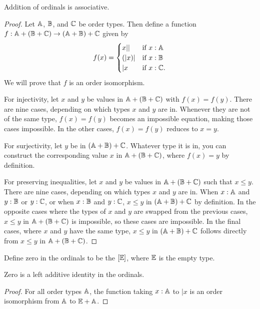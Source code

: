 \documentclass[../../math.tex]{subfiles}
\begin{document}
\begin{instance}
    Addition of ordinals is associative.
\end{instance}
\begin{proof}
    Let $\mathbb{A}$, $\mathbb{B}$, and $\mathbb{C}$ be order types.  Then define a function $f : \mathbb{A} +
    (\mathbb{B} + \mathbb{C}) \to (\mathbb{A} + \mathbb{B}) + \mathbb{C}$ given by
    \[
        f(x) =
        \begin{cases}
            x|| &\text{if $x : \mathbb{A}$} \\
            (|x)| &\text{if $x : \mathbb{B}$} \\
            |x &\text{if $x : \mathbb{C}$.}
        \end{cases}
    \]
    We will prove that $f$ is an order isomorphism.

    For injectivity, let $x$ and $y$ be values in $\mathbb{A} + (\mathbb{B} + \mathbb{C})$ with $f(x) =
    f(y)$.  There are nine cases, depending on which types $x$ and $y$ are in.
    Whenever they are not of the same type, $f(x) = f(y)$ becomes an impossible
    equation, making those cases impossible.  In the other cases, $f(x) = f(y)$
    reduces to $x = y$.

    For surjectivity, let $y$ be in $(\mathbb{A} + \mathbb{B}) + \mathbb{C}$.  Whatever type it is in,
    you can construct the corresponding value $x$ in $\mathbb{A} + (\mathbb{B} + \mathbb{C})$, where
    $f(x) = y$ by definition.

    For preserving inequalities, let $x$ and $y$ be values in $\mathbb{A} + (\mathbb{B} + \mathbb{C})$
    such that $x \leq y$.  There are nine cases, depending on which types $x$
    and $y$ are in.  When $x : \mathbb{A}$ and $y : \mathbb{B}$ or $y : \mathbb{C}$, or when $x : \mathbb{B}$
    and $y : \mathbb{C}$, $x \leq y$ in $(\mathbb{A} + \mathbb{B}) + \mathbb{C}$ by definition.  In the opposite
    cases where the types of $x$ and $y$ are swapped from the previous cases, $x
    \leq y$ in $\mathbb{A} + (\mathbb{B} + \mathbb{C})$ is impossible, so these cases are impossible.
    In the final cases, where $x$ and $y$ have the same type, $x \leq y$ in $(\mathbb{A}
    + \mathbb{B}) + \mathbb{C}$ follows directly from $x \leq y$ in $\mathbb{A} + (\mathbb{B} + \mathbb{C})$.
\end{proof}

\begin{instance}
    Define zero in the ordinals to be the $[\mathbb{E}]$, where $\mathbb{E}$ is the empty type.
\end{instance}

\begin{instance}
    Zero is a left additive identity in the ordinals.
\end{instance}
\begin{proof}
    For all order types $\mathbb{A}$, the function taking $x : \mathbb{A}$ to $|x$ is an order
    isomorphism from $\mathbb{A}$ to $\mathbb{E} + \mathbb{A}$.
\end{proof}
\end{document}
